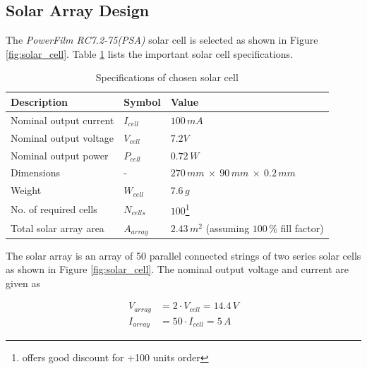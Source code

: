 \subsection{Solar Array Design}
The \textit{PowerFilm RC7.2-75(PSA)} solar cell is selected as shown in Figure \ref{fig:solar_cell}. Table \ref{tab:solar_cell_spec} lists the important solar cell specifications.

\begin{table}[H]
\centering
\caption{Specifications of chosen solar cell}
\label{tab:solar_cell_spec}
\begin{minipage}{\textwidth}
\begin{tabular}{p{}p{}p{}}
\hline
\textbf{Description} & \textbf{Symbol} & \textbf{Value}\\
\hline
Nominal output current & $I_{cell}$ & $100\,mA$\\
Nominal output voltage & $V_{cell}$ & $7.2V$\\
Nominal output power & $P_{cell}$ & $0.72\,W$\\
Dimensions & - & $270\,mm\:\times\:90\,mm\:\times\:0.2\,mm$\\
Weight & $W_{cell}$ & $7.6\,g$\\
No. of required cells & $N_{cells}$ & $100$\footnote{\cite{avnetexpress} offers good discount for +100 units order}\\
Total solar array area & $A_{array}$ & $2.43\,m^2$ (assuming $100\,\%$ fill factor)\\
\hline
\end{tabular}\par
\vspace{-0.75\skip\footins}
\renewcommand{\footnoterule}{}
\end{minipage}
\end{table}

The solar array is an array of 50 parallel connected strings of two series solar cells as shown in Figure \ref{fig:solar_cell}. The nominal output voltage and current are given as

\begin{equation}
\begin{split}
V_{array}&=2\cdot V_{cell}=14.4\,V\\
I_{array}&=50\cdot I_{cell}=5\,A
\end{split}
\end{equation}

